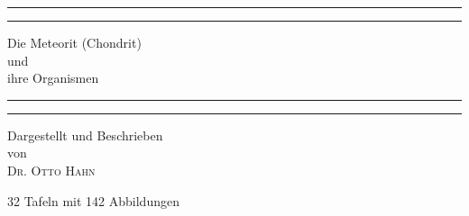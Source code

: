 \documentclass[a4paper, 11pt, oneside]{article}
\begin{document}
\begin{titlepage} %
	\centering %
	\scshape %

	
	\rule{\textwidth}{1.6pt}\vspace*{-\baselineskip}\vspace*{2pt} %
	\rule{\textwidth}{0.4pt} %
	
	\vspace{0.75\baselineskip} %
	
	{\Huge Die Meteorit (Chondrit)\\ und\\ ihre Organismen\\} %
	
	\vspace{0.75\baselineskip} %
	
	\rule{\textwidth}{0.4pt}\vspace*{-\baselineskip}\vspace{3.2pt} %
	\rule{\textwidth}{1.6pt} %
	
	\vspace{1\baselineskip} %
	
	
	{\Large Dargestellt und Beschrieben\\ von\\ \scshape\Large Dr. Otto Hahn\\} %
	
	\vspace*{1\baselineskip} %
	
    {\large 32 Tafeln mit 142 Abbildungen} %
    
	
	\vspace{1\baselineskip} %
	
	

\end{titlepage}
\end{document}
